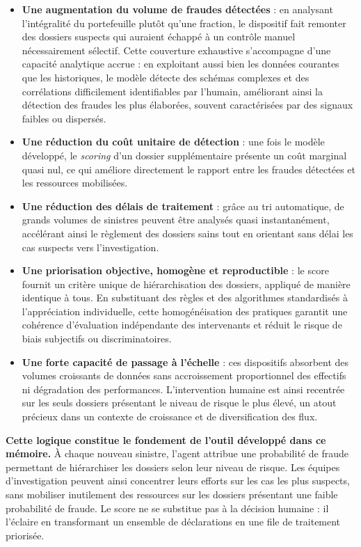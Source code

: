 \begin{itemize}
    \item[$\bullet$] \textbf{Une augmentation du volume de fraudes détectées} : en analysant l'intégralité du portefeuille plutôt qu'une fraction, le dispositif fait remonter des dossiers suspects qui auraient échappé à un contrôle manuel nécessairement sélectif. Cette couverture exhaustive s'accompagne d'une capacité analytique accrue : en exploitant aussi bien les données courantes que les historiques, le modèle détecte des schémas complexes et des corrélations difficilement identifiables par l'humain, améliorant ainsi la détection des fraudes les plus élaborées, souvent caractérisées par des signaux faibles ou dispersés.
    \item[$\bullet$] \textbf{Une réduction du coût unitaire de détection} : une fois le modèle développé, le \textit{scoring} d'un dossier supplémentaire présente un coût marginal quasi nul, ce qui améliore directement le rapport entre les fraudes détectées et les ressources mobilisées.
    \item[$\bullet$] \textbf{Une réduction des délais de traitement} : grâce au tri automatique, de grands volumes de sinistres peuvent être analysés quasi instantanément, accélérant ainsi le règlement des dossiers sains tout en orientant sans délai les cas suspects vers l'investigation.
    \item[$\bullet$] \textbf{Une priorisation objective, homogène et reproductible} : le score fournit un critère unique de hiérarchisation des dossiers, appliqué de manière identique à tous. En substituant des règles et des algorithmes standardisés à l'appréciation individuelle, cette homogénéisation des pratiques garantit une cohérence d'évaluation indépendante des intervenants et réduit le risque de biais subjectifs ou discriminatoires.
    \item[$\bullet$] \textbf{Une forte capacité de passage à l'échelle} : ces dispositifs absorbent des volumes croissants de données sans accroissement proportionnel des effectifs ni dégradation des performances. L'intervention humaine est ainsi recentrée sur les seuls dossiers présentant le niveau de risque le plus élevé, un atout précieux dans un contexte de croissance et de diversification des flux.
\end{itemize}

\textbf{Cette logique constitue le fondement de l'outil développé dans ce mémoire.} À chaque nouveau sinistre, l'agent attribue une probabilité de fraude permettant de hiérarchiser les dossiers selon leur niveau de risque. Les équipes d'investigation peuvent ainsi concentrer leurs efforts sur les cas les plus suspects, sans mobiliser inutilement des ressources sur les dossiers présentant une faible probabilité de fraude. Le score ne se substitue pas à la décision humaine : il l'éclaire en transformant un ensemble de déclarations en une file de traitement priorisée.


